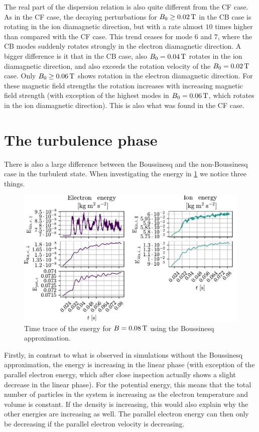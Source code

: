 The real part of the dispersion relation is also quite different from the CF case.
As in the CF case, the decaying perturbations for $B_0 \geq 0.02\, \text{T}$ in the CB case is rotating in the ion diamagnetic direction, but with a rate almost $10$ times higher than compared with the CF case.
This trend ceases for mode $6$ and $7$, where the CB modes suddenly rotates strongly in the electron diamagnetic direction.
A bigger difference is it that in the CB case, also $B_0 = 0.04\, \text{T}$ rotates in the ion diamagnetic direction, and also exceeds the rotation velocity of the $B_0 = 0.02\, \text{T}$ case.
Only $B_0 \geq 0.06\, \text{T}$ shows rotation in the electron diamagnetic direction.
For these magnetic field strengths the rotation increases with increasing magnetic field strength (with exception of the highest modes in $B_0 = 0.06\, \text{T}$, which rotates in the ion diamagnetic direction).
This is also what was found in the CF case.

\section{The turbulence phase}
\label{sec:turbB}
%
There is also a large difference between the Boussinesq and the non-Boussinesq case in the turbulent state.
When investigating the energy in \cref{fig:energies008B} we notice three things.
%
\begin{figure}[htb]
    \centering
    \includegraphics{fig/results/compareBouss/energies008B}
    \caption{Time trace of the energy for $B=0.08\, \text{T}$ using the Boussinesq approximation.}
    \label{fig:energies008B}
\end{figure}
%
Firstly, in contrast to what is observed in simulations without the Boussinesq approximation, the energy is increasing in the linear phase (with exception of the parallel electron energy, which after close inspection actually shows a slight decrease in the linear phase).
For the potential energy, this means that the total number of particles in the system is increasing as the electron temperature and volume is constant.
If the density is increasing, this would also explain why the other energies are increasing as well.
The parallel electron energy can then only be decreasing if the parallel electron velocity is decreasing.

